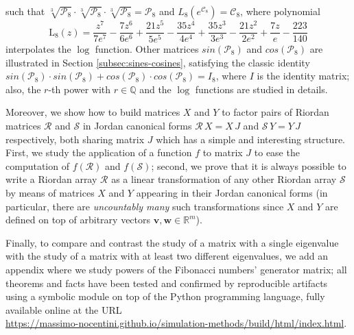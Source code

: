 such that %
$\sqrt[3]{\mathcal{P}_8} \cdot \sqrt[3]{\mathcal{P}_8} \cdot
\sqrt[3]{\mathcal{P}_8} =\mathcal{P}_8$ and
$L_{8}\left({e^{\mathcal{C}_{8}}}\right) = \mathcal{C}_{8}$, where polynomial
\begin{displaymath}
\operatorname{L_{ 8 }}{\left (z \right )} = \frac{z^{7}}{7 e^{7}} - \frac{7 z^{6}}{6 e^{6}} + \frac{21 z^{5}}{5 e^{5}} - \frac{35 z^{4}}{4 e^{4}} + \frac{35 z^{3}}{3 e^{3}} - \frac{21 z^{2}}{2 e^{2}} + \frac{7 z}{e} - \frac{223}{140}
\end{displaymath}
interpolates the $\log$ function. Other matrices $sin(\mathcal{P}_8)$ and
$cos(\mathcal{P}_8)$ are illustrated in Section \ref{subsec:sines-cosines},
satisfying the classic identity $sin(\mathcal{P}_8)\cdot sin(\mathcal{P}_8)+
cos(\mathcal{P}_8)\cdot cos(\mathcal{P}_8)=I_{8}$, where $I$ is the identity
matrix; also, the $r$-th power with $r\in\mathbb{Q}$ and the $\log$ functions
are studied in details.

Moreover, we show how to build matrices $X$ and $Y$ to factor pairs of Riordan
matrices $\mathcal{R}$ and $\mathcal{S}$ in  Jordan canonical forms
$\mathcal{R}\,X=X\,J$ and $\mathcal{S}\,Y=Y\,J$ respectively, both sharing
matrix $J$ which has a simple and interesting structure. First, we study the
application of a function $f$ to matrix $J$  to ease the computation of
$f(\mathcal{R})$ and $f(\mathcal{S})$; second, we prove that it is always
possible to write a Riordan array $\mathcal{R}$ as a linear transformation of
any other Riordan array $\mathcal{S}$ by means of matrices $X$ and $Y$
appearing in their Jordan canonical forms (in particular, there are
\textit{uncountably many} such transformations since $X$ and $Y$ are defined on
top of arbitrary vectors $\boldsymbol{v},\boldsymbol{w}\in\mathbb{R}^{m}$).


Finally, to compare and contrast the study of a matrix with a single eigenvalue
with the study of a matrix with at least two different eigenvalues, we add an
appendix where we study powers of the Fibonacci numbers' generator matrix;
all theorems and facts have been tested and confirmed by reproducible artifacts
using a symbolic module on top of the Python programming language, fully
available online at the URL\\ {\small\url{https://massimo-nocentini.github.io/simulation-methods/build/html/index.html}}.


